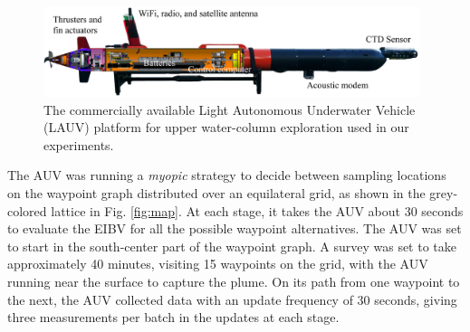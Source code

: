 \documentclass[aoas]{imsart}
\begin{document}
\begin{figure}[!h] 
\centering 
\includegraphics[width=0.98\textwidth]{Figures/harald.jpg}
\caption{The commercially available Light Autonomous Underwater
  Vehicle (LAUV) platform for upper water-column exploration used in
  our experiments.}
\label{fig:lauv}
\end{figure} 

The AUV was running a
\textit{myopic} strategy to decide between sampling locations on the waypoint graph distributed over an equilateral grid, as shown in the grey-colored lattice in Fig. \ref{fig:map}. 
At each stage, it takes the AUV about 30
seconds to evaluate the EIBV for all the possible waypoint
alternatives.
The AUV was set to start in the south-center part of the waypoint
graph. A survey was set to take
approximately 40 minutes, visiting 15 waypoints on the grid, with the
AUV running near the surface to capture the plume. On its path from
one waypoint to the next, the AUV collected data with an update
frequency of 30 seconds, giving three measurements per batch in the updates at each stage. 
\end{document}
